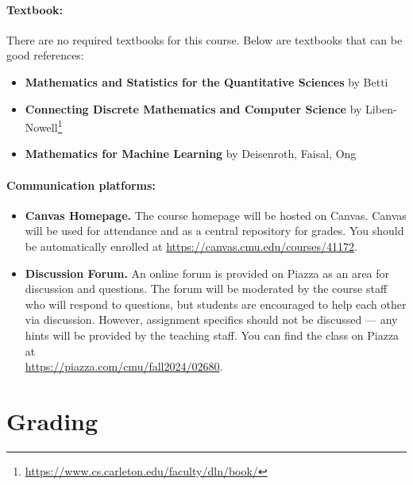 \documentclass[12pt]{scrartcl}
\begin{document}
\paragraph{Textbook:} 
There are no required textbooks for this course. Below are textbooks that can be good references: 
\begin{itemize}

\item \textbf{Mathematics and Statistics for the Quantitative Sciences} by Betti
\item \textbf{Connecting Discrete Mathematics and Computer Science} by Liben-Nowell\footnote{\url{https://www.cs.carleton.edu/faculty/dln/book/}}
\item \textbf{Mathematics for Machine Learning} by Deisenroth, Faisal, Ong
\end{itemize}

\paragraph{Communication platforms:}
\begin{itemize}
\item \textbf{Canvas Homepage.} 
The course homepage will be hosted on Canvas. 
Canvas will be used for attendance and as a central repository for grades. 
You should be automatically enrolled at \url{https://canvas.cmu.edu/courses/41172}.
\item \textbf{Discussion Forum.} 
An online forum is provided on Piazza as an area for discussion and questions. 
The forum will be moderated by the course staff who will respond to questions, 
but students are encouraged to help each other via discussion. 
However, assignment specifics should not be discussed --- 
any hints will be provided by the teaching staff. 
You can find the class on Piazza at\\ \url{https://piazza.com/cmu/fall2024/02680}.
\end{itemize}

\section{Grading}
\end{document}
